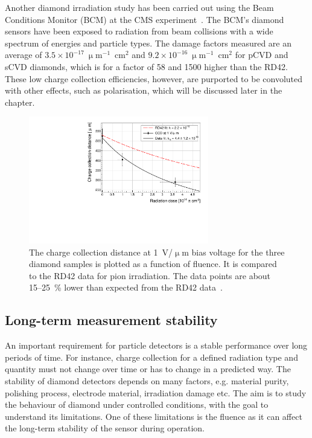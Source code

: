 Another diamond irradiation study has been carried out using the Beam Conditions Monitor (BCM) at the CMS experiment~\cite{Guthoff:1977429}. The BCM's diamond sensors have been exposed to radiation from beam collisions with a wide spectrum of energies and particle types. The damage factors measured are an average of $3.5\times10^{-17}~\upmu$m$^{-1}$~cm$^{2}$ and $9.2\times10^{-16}~\upmu$m$^{-1}$~cm$^{2}$ for pCVD and sCVD diamonds, which is for a factor of 58 and 1500 higher than the RD42. These low charge collection efficiencies, however, are purported to be convoluted with other effects, such as polarisation, which will be discussed later in the chapter.


\begin{figure}[!t]
\centering
\includegraphics[width=0.70\textwidth]{03_measurement_results/scripts/plots/radfactor1}
\caption{The charge collection distance at 1~V/$\upmu$m bias voltage for the three diamond samples is plotted as a function of fluence. It is compared to the RD42 data for pion irradiation. The data points are about 15--25~\% lower than expected from the RD42 data~\cite{RD42IRRAD:00000}.}
 \label{fig:radfactor}
\end{figure}



\subsection{Long-term measurement stability}
\label{sec:longterm}
An important requirement for particle detectors is a stable performance over long periods of time. For instance, charge collection for a defined radiation type and quantity must not change over time or has to change in a predicted way. The stability of diamond detectors depends on many factors, e.g. material purity, polishing process, electrode material, irradiation damage etc. The aim is to study the behaviour of diamond under controlled conditions, with the goal to understand its limitations. One of these limitations is the fluence as it can affect the long-term stability of the sensor during operation. 

